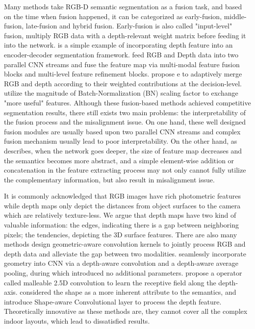 ﻿\documentclass[journal]{IEEEtran}
\begin{document}
    Many methods take RGB-D semantic segmentation as a fusion task, and based on the time when fusion happened, it can be categorized as early-fusion, middle-fusion, late-fusion and hybrid fusion\cite{zhang2021deep}. Early-fusion is also called "input-level" fusion, \cite{cao2021rgbxd} multiply RGB data with a depth-relevant weight matrix before feeding it into the network.  \cite{2016fusenet} is a simple example of incorporating  depth feature into an encoder-decoder segmentation framework. \cite{park2017rdfnet} feed RGB and Depth data into two parallel CNN streams and fuse the feature map via multi-modal feature fusion blocks and multi-level feature refinement blocks. \cite{cheng2017locality} propose e to adaptively merge RGB and depth according to their weighted contributions at the decision-level. \cite{2020deep} utilize the magnitude of Batch-Normalization (BN) scaling factor to exchange "more useful" features. Although these fusion-based methods achieved competitive segmentation results, there still exists two main problems: the interpretability of the fusion process and the misalignment issue. On one hand, these well designed fusion modules are usually based upon two parallel CNN streams and complex fusion mechanism usually lead to poor interpretability. On the other hand, as \cite{2021global} describes, when the network goes deeper, the size of feature map decreases and the semantics becomes more abstract, and a simple element-wise addition or concatenation in the feature extracting process may not only cannot fully utilize the complementary information, but also result in misalignment issue.
 
    It is commonly acknowledged that RGB images have rich photometric features while depth maps only depict the distances from object surfaces to the camera which are relatively texture-less. We argue that depth maps have two kind of valuable information: the edges, indicating there is a gap between neighboring pixels; the tendencies, depicting the 3D surface features. There are also many methods design geometric-aware convolution kernels to jointly process RGB and depth data and alleviate the gap between two modalities. \cite{2018depthaware} seamlessly incorporate geometry into CNN via a depth-aware convolution and a depth-aware average pooling, during which introduced no additional parameters. \cite{2020malleable} propose a operator called malleable 2.5D convolution to learn the receptive field along the depth-axis. \cite{2021shapeconv} considered the shape as a more inherent attribute to the semantics, and introduce Shape-aware Convolutional layer to process the depth feature. Theoretically innovative as these methods are, they cannot cover all the complex indoor layouts, which lead to dissatisfied results. 
\end{document}
